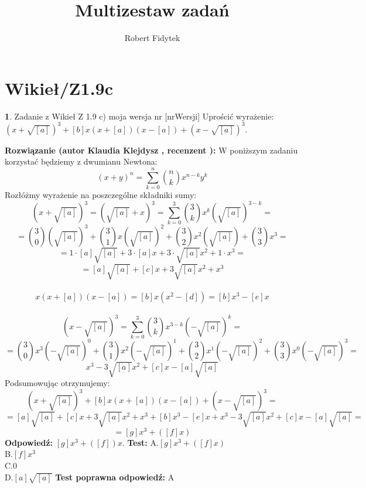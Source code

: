 \documentclass[12pt, a4paper]{article}
\title{Multizestaw zadań}
\author{Robert Fidytek}
\date{}
\theoremstyle{definition} %
\newtheorem{zad}{}
\newcommand{\kategoria}[1]{\section{#1}} %
\newcommand{\zadStart}[1]{\begin{zad}#1\newline} %
\newcommand{\zadStop}{\end{zad}}   %
\newcommand{\rozwStart}[2]{\noindent \textbf{Rozwiązanie (autor #1 , recenzent #2): }\newline} %
\newcommand{\rozwStop}{\newline}                                            %
\newcommand{\odpStart}{\noindent \textbf{Odpowiedź:}\newline}    %
\newcommand{\odpStop}{\newline}                                             %
\newcommand{\testStart}{\noindent \textbf{Test:}\newline} %
\newcommand{\testStop}{\newline} %
\newcommand{\kluczStart}{\noindent \textbf{Test poprawna odpowiedź:}\newline} %
\newcommand{\kluczStop}{\newline} %
\begin{document}
\maketitle


\kategoria{Wikieł/Z1.9c}
\zadStart{Zadanie z Wikieł Z 1.9 c) moja wersja nr [nrWersji]}
Uprościć wyrażenie: $
(x+\sqrt{[a]})^3+[b]x(x+[a])(x-[a])+(x-\sqrt{[a]})^3$.
\zadStop
\rozwStart{Klaudia Klejdysz}{}
W poniższym zadaniu korzystać będziemy z dwumianu Newtona:
\begin{equation*}
(x+y)^n=\sum_{k=0}^n {{n}\choose {k} }x^{n-k}y^k   
\end{equation*}
\noindent Rozłóżmy wyrażenie na poszczególne składniki sumy:
\begin{equation*}
    (x+\sqrt{[a]})^3=(\sqrt{[a]}+x)^3=\sum_{k=0}^3 {{3}\choose {k} }x^{k}(\sqrt{[a]})^{3-k}=
    \end{equation*}
    \begin{equation*}
    ={{3}\choose {0} }(\sqrt{[a]})^3+{{3}\choose {1} }x(\sqrt{[a]})^2+{{3}\choose {2} }x^2(\sqrt{[a]})+{{3}\choose {3} }x^3=
\end{equation*}
\begin{equation*}
=1\cdot[a]\sqrt{[a]}+3\cdot[a]x+3\cdot\sqrt{[a]}x^2+1\cdot x^3=
\end{equation*}
\begin{equation*}
=[a]\sqrt{[a]}+[c]x+3\sqrt{[a]}x^2+x^3
\end{equation*}
\\
\begin{equation*}
[b]x(x+[a])(x-[a])=[b]x(x^2-[d])=[b]x^3-[e]x    
\end{equation*}
\\
\begin{equation*}
 (x-\sqrt{[a]})^3=\sum_{k=0}^3 {{3}\choose {k} }x^{3-k}(-\sqrt{[a]})^{k}=   
\end{equation*}
\begin{equation*}
 ={{3}\choose {0} }x^3(-\sqrt{[a]})^0+{{3}\choose {1} }x^2(-\sqrt{[a]})^1+{{3}\choose {2} }x^1(-\sqrt{[a]})^2+{{3}\choose {3} }x^0(-\sqrt{[a]})^3=
\end{equation*}
\begin{equation*}
x^3-3\sqrt{[a]}x^2+[c]x-[a]\sqrt{[a]}
\end{equation*}
Podsumowując otrzymujemy:
\begin{equation*}
(x+\sqrt{[a]})^3+[b]x(x+[a])(x-[a])+(x-\sqrt{[a]})^3=
\end{equation*}
\begin{equation*}
=[a]\sqrt{[a]}+[c]x+3\sqrt{[a]}x^2+x^3+ [b]x^3-[e]x+x^3-3\sqrt{[a]}x^2+[c]x-[a]\sqrt{[a]}=
\end{equation*}
\begin{equation*}
    =[g]x^3+([f]x)
\end{equation*}
\rozwStop
\odpStart
$[g]x^3+([f])x$.
\odpStop
\testStart
A.$[g]x^3+([f]x)$\\
B.$[f]x^3$\\
C.$0$\\
D.$[a]\sqrt{[a]}$
\testStop
\kluczStart
A
\kluczStop
\end{document}
